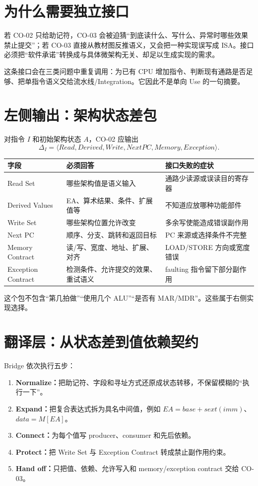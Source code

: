 \documentclass[UTF8,fontset=fandol,11pt,a4paper]{ctexart}
\newcommand{\kw}[1]{\textbf{\color{deep}#1}}
\begin{document}
\tableofcontents

\section{为什么需要独立接口}

若 CO-02 只给助记符，CO-03 会被迫猜“到底读什么、写什么、异常时哪些效果禁止提交”；若 CO-03 直接从教材图反推语义，又会把一种实现误写成 ISA。接口必须把“软件承诺”转换成与具体微架构无关、却足以生成实现的需求。

这条接口会在三类问题中重复调用：为已有 CPU 增加指令、判断现有通路是否足够、把单指令语义交给流水线/Integration。它因此不是单向 Use 的一句摘要。

\section{左侧输出：架构状态差包}

对指令 $I$ 和初始架构状态 $A$，CO-02 应输出
\[
\Delta_I=
\langle
Read, Derived, Write, NextPC, Memory, Exception
\rangle.
\]

\begin{center}
\small
\begin{tabularx}{\linewidth}{L{2.4cm}Y Y}
\toprule
字段 & 必须回答 & 接口失败的症状\\
\midrule
Read Set & 哪些架构值是语义输入 & 通路少读源或误读目的寄存器\\
Derived Values & EA、算术结果、条件、扩展值等 & 不知道应放哪种功能部件\\
Write Set & 哪些架构位置允许改变 & 多余写使能造成错误副作用\\
Next PC & 顺序、分支、跳转和返回目标 & PC 来源或选择条件不完整\\
Memory Contract & 读/写、宽度、地址、扩展、对齐 & LOAD/STORE 方向或宽度错误\\
Exception Contract & 检测条件、允许提交的效果、重试语义 & faulting 指令留下部分副作用\\
\bottomrule
\end{tabularx}
\end{center}

这个包不包含“第几拍做”“使用几个 ALU”“是否有 MAR/MDR”。这些属于右侧实现选择。

\section{翻译层：从状态差到值依赖契约}

Bridge 依次执行五步：
\begin{enumerate}
  \item \kw{Normalize：}把助记符、字段和寻址方式还原成状态转移，不保留模糊的“执行一下”。
  \item \kw{Expand：}把复合表达式拆为具名中间值，例如 $EA=base+sext(imm)$、$data=M[EA]$。
  \item \kw{Connect：}为每个值写 producer、consumer 和先后依赖。
  \item \kw{Protect：}把 Write Set 与 Exception Contract 转成禁止副作用约束。
  \item \kw{Hand off：}只把值、依赖、允许写入和 memory/exception contract 交给 CO-03。
\end{enumerate}
\end{document}
